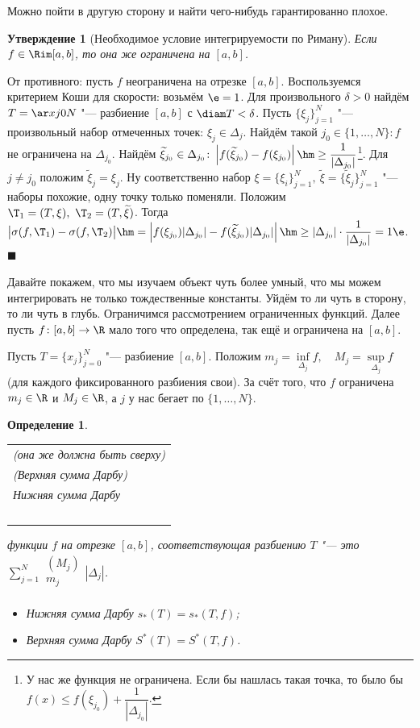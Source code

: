 \documentclass[a4paper,10pt,twoside]{article}
\newtheorem{Def}{Определение}[section]
\newtheorem{Ut}{Утверждение}[section]
\newenvironment{Proof}
       {\par\noindent{\textbf{Доказательство.}}}
       {\hfill$\scriptstyle\blacksquare$}
\begin{document}
 Можно пойти в другую сторону и найти чего-нибудь гарантированно плохое.
 
 \begin{Ut}[Необходимое условие интегрируемости по Риману]\label{Rimneob}
 	Если $f\in\Rim[a,b]$, то она же ограничена на $[a,b]$.
 \end{Ut}
 
 \begin{Proof}
 	От противного: пусть $f$ неограничена на отрезке $[a,b]$. Воспользуемся критерием Коши для скорости:
 	возьмём $\e=1$. Для произвольного $\delta>0$ найдём $T=\ar xj0N$ "--- разбиение $[a,b]$ с $\diam T<\delta$.
 	Пусть $\{\xi_j\}_{j=1}^N$ "--- произвольный набор отмеченных точек: $\xi_j\in\Delta_j$.
 	Найдём такой $j_0\in\{1,\ldots,N\}\colon f$ не ограничена на $\Delta_{j_0}$. Найдём $\widetilde\xi_{j_0}\in\Delta_{j_0}\colon
 	\left|f(\widetilde\xi_{j_0})-f(\xi_{j_0})\right|\hm\geq\dfrac1{|\Delta_{j_0}|}$\footnote{У нас же функция
 	не ограничена. Если бы нашлась такая точка, то было бы $f(x)\leq f(\xi_{j_0})+\dfrac{1}{|\Delta_{j_0}|}$.}.
 	Для $j\neq j_0$ положим $\widetilde\xi_j=\xi_j$. Ну соответственно набор $\xi=\{\xi_i\}_{j=1}^N,\ \widetilde\xi=\{\widetilde\xi_j\}_{j=1}^N$ "---
 	наборы похожие, одну точку только поменяли.
 	Положим $\T_1=(T,\xi),\ \T_2=(T,\widetilde\xi)$. Тогда $\big|\sigma(f,\T_1)-\sigma(f,\T_2)\big|\hm=\left|f(\xi_{j_0})|\Delta_{j_0}|-f(\widetilde\xi_{j_0})|\Delta_{j_0}|\right|
 	\hm\geq|\Delta_{j_0}|\cdot\dfrac1{|\Delta_{j_0}|}=1\e$.
 \end{Proof}
 
 Давайте покажем, что мы изучаем объект чуть более умный, что мы можем интегрировать не только тождественные константы. 
 Уйдём то ли чуть в сторону, то ли чуть в глубь. Ограничимся рассмотрением ограниченных функций. Далее пусть
 $f\colon[a,b]\to\R$ мало того что определена, так ещё и ограничена на $[a,b]$.
 
 Пусть $T=\{x_j\}_{j=0}^N$ "--- разбиение $[a,b]$. Положим $m_j=\inf\limits_{\Delta_j}f,\quad M_j=\sup\limits_{\Delta_j}f$ 
 (для каждого фиксированного разбиения свои). За счёт того, что $f$ ограничена $m_j\in\R$ и $M_j\in\R$, а $j$ у нас бегает по $\{1,\ldots,N\}$.
 
 \begin{Def}
 	\begin{tabular}{l}\scriptsize{(она же должна быть сверху)}\\(Верхняя сумма Дарбу)\\Нижняя сумма Дарбу\\ \ \end{tabular} функции $f$ на отрезке $[a,b]$, соответствующая
 	разбиению $T$ "--- это $\sum\limits_{j=1}^N\begin{matrix}(M_j)\\m_j\\ \ \end{matrix}|\Delta_j|$.
 	
 	\begin{itemize}
 	  \item Нижняя сумма Дарбу $s_*(T)=s_*(T,f)$;
 	  \item Верхняя сумма Дарбу $S^*(T)=S^*(T,f)$. 
 	\end{itemize}
 \end{Def}
 
\end{document}
